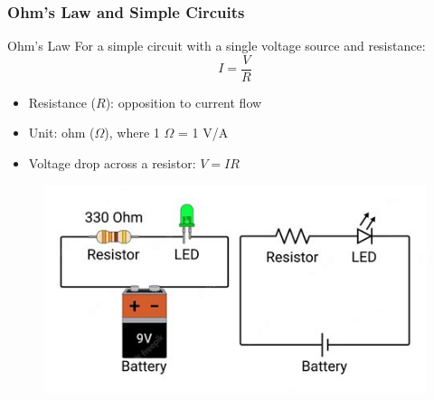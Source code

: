 \documentclass{beamer}
\begin{document}
\begin{frame}
    \frametitle{Ohm's Law and Simple Circuits}
    \begin{block}{Ohm's Law}
        For a simple circuit with a single voltage source and resistance:
        \[ I = \frac{V}{R} \]
    \end{block}
    \begin{itemize}
        \item Resistance ($R$): opposition to current flow
        \item Unit: ohm ($\Omega$), where 1 $\Omega$ = 1 V/A
        \item Voltage drop across a resistor: $V = IR$
    \end{itemize}
    \begin{center}
        \begin{figure}
            \centering
            \includegraphics[width=0.5\linewidth]{th-991058791.jpg}
        \end{figure}
    \end{center}
\end{frame}
\end{document}
